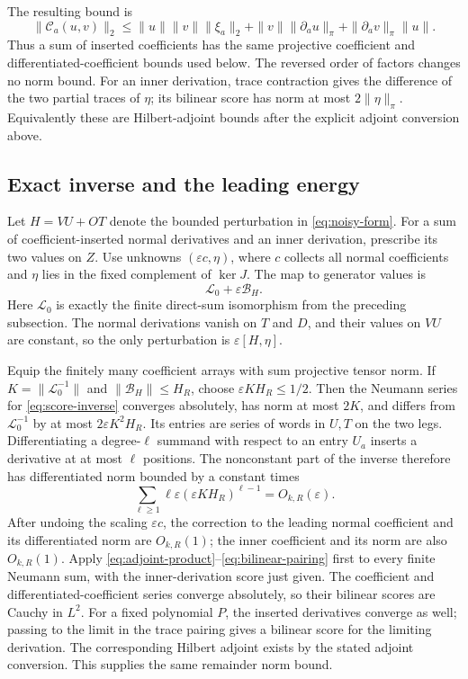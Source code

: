 \documentclass[11pt]{article}
\theoremstyle{definition}\newtheorem{definition}[theorem]{Definition}
\theoremstyle{remark}\newtheorem{remark}[theorem]{Remark}
\newcommand{\eps}{\varepsilon}\newcommand{\id}{\mathrm{id}}
\begin{document}
The resulting bound is
\[
 \|\mathcal C_a(u,v)\|_2\leq
 \|u\|\|v\|\|\xi_a\|_2
 +\|v\|\|\partial_a u\|_\pi
 +\|\partial_a v\|_\pi\|u\|.
\]
Thus a sum of inserted coefficients has the same projective coefficient
and differentiated-coefficient bounds used below. The reversed order
of factors changes no norm bound. For an inner derivation, trace
contraction gives the difference of the two partial traces of $\eta$;
its bilinear score has norm at most $2\|\eta\|_\pi$. Equivalently these
are Hilbert-adjoint bounds after the explicit adjoint conversion above.

\subsection{Exact inverse and the leading energy}
Let $H=VU+OT$ denote the bounded perturbation in \eqref{eq:noisy-form}.
For a sum of coefficient-inserted normal derivatives and an inner
derivation, prescribe its two values on $Z$. Use unknowns
$(\eps c,\eta)$, where $c$ collects all normal coefficients and
$\eta$ lies in the fixed complement of $\ker J$. The map to generator
values is
\begin{equation}\label{eq:score-inverse}
 \mathcal L_0+\eps\mathcal B_H.
\end{equation}
Here $\mathcal L_0$ is exactly the finite direct-sum isomorphism from
the preceding subsection. The normal derivations vanish on $T$ and
$D$, and their values on $VU$ are constant, so the only perturbation is
$\eps[H,\eta]$.

Equip the finitely many coefficient arrays with sum projective tensor
norm. If $K=\|\mathcal L_0^{-1}\|$ and
$\|\mathcal B_H\|\leq H_R$, choose $\eps KH_R\leq1/2$.
Then the Neumann series for \eqref{eq:score-inverse} converges absolutely,
has norm at most $2K$, and differs from $\mathcal L_0^{-1}$ by at most
$2\eps K^2H_R$. Its entries are series of words in $U,T$ on the two
legs. Differentiating a degree-$\ell$ summand with respect to an entry
$U_a$ inserts a derivative at at most $\ell$ positions. The
nonconstant part of the inverse therefore has differentiated norm
bounded by a constant times
\[
 \sum_{\ell\geq1}\ell\eps(\eps KH_R)^{\ell-1}=O_{k,R}(\eps).
\]
After undoing the scaling $\eps c$, the correction to the leading
normal coefficient and its differentiated norm are $O_{k,R}(1)$;
the inner coefficient and its norm are also $O_{k,R}(1)$.
Apply \eqref{eq:adjoint-product}--\eqref{eq:bilinear-pairing} first
to every finite Neumann sum, with the inner-derivation score just given.
The coefficient and differentiated-coefficient series converge
absolutely, so their bilinear scores are Cauchy in $L^2$. For a fixed
polynomial $P$, the inserted derivatives converge as well; passing to
the limit in the trace pairing gives a bilinear score for the limiting
derivation. The corresponding Hilbert adjoint exists by the stated
adjoint conversion. This supplies the same remainder norm bound.
\end{document}
